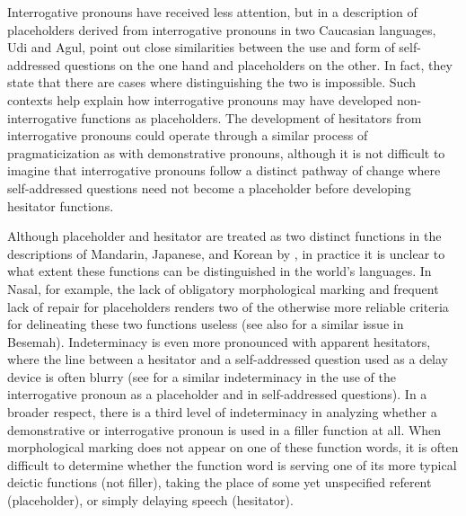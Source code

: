 \documentclass[output=paper,colorlinks,citecolor=brown
\ChapterDOI{10.5281/zenodo.15697585}
]{langscibook}
\begin{document}
Interrogative pronouns have received less attention, but in a description of placeholders derived from interrogative pronouns in two Caucasian languages, Udi and Agul, \citet{ganenkov2010interrogatives} point out close similarities between the use and form of self-addressed questions on the one hand and placeholders on the other. In fact, they state that there are cases where distinguishing the two is impossible. Such contexts help explain how interrogative pronouns may have developed non-interrogative functions as placeholders. The development of hesitators from interrogative pronouns could operate through a similar process of pragmaticization as with demonstrative pronouns, although it is not difficult to imagine that interrogative pronouns follow a distinct pathway of change where self-addressed questions need not become a placeholder before developing hesitator functions.

Although placeholder and hesitator are treated as two distinct functions in the descriptions of Mandarin, Japanese, and Korean by \citet[][]{hayashi2006crosslinguistic}, in practice it is unclear to what extent these functions can be distinguished in the world's languages. In Nasal, for example, the lack of obligatory morphological marking and frequent lack of repair for placeholders renders two of the otherwise more reliable criteria for delineating these two functions useless (see also \cite{chapters/mcdonnell_billings} for a similar issue in Besemah). Indeterminacy is even more pronounced with apparent hesitators, where the line between a hesitator and a self-addressed question used as a delay device is often blurry (see \cite[][33]{ganenkov2010interrogatives} for a similar indeterminacy in the use of the interrogative pronoun as a placeholder and in self-addressed questions). In a broader respect, there is a third level of indeterminacy in analyzing whether a demonstrative or interrogative pronoun is used in a filler function at all. When morphological marking does not appear on one of these function words, it is often difficult to determine whether the function word is serving one of its more typical deictic functions (not filler), taking the place of some yet unspecified referent (placeholder), or simply delaying speech (hesitator).
\end{document}
